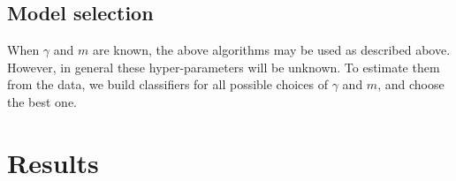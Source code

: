 



\subsection{Model selection} %
\label{sub:model_selection}

When $\gamma$ and $m$ are known, the above algorithms may be used as described above.  However, in general these hyper-parameters will be unknown.  To estimate them from the data, we build classifiers for all possible choices of $\gamma$ and $m$, and choose the best one.  









\section{Results} %
\label{sub:theoretical_results}

